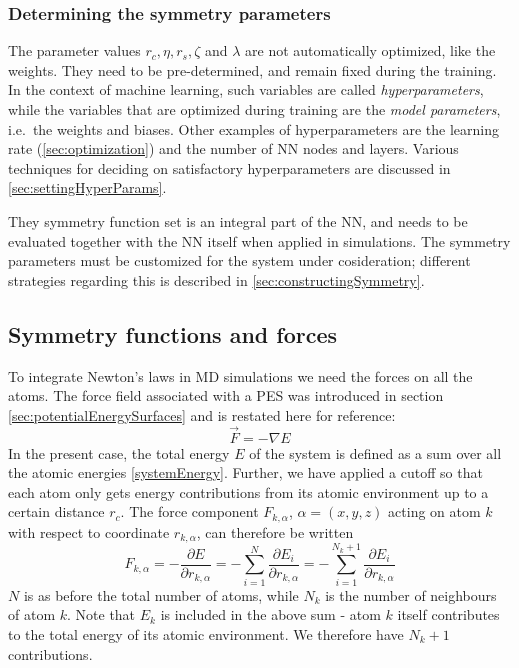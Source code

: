 \documentclass[twoside,english]{uiofysmaster}
\begin{document}
\subsubsection{Determining the symmetry parameters}
The parameter values $r_c, \eta, r_s, \zeta$ and $\lambda$ are not automatically optimized, like the weights. 
They need to be pre-determined, and remain fixed during the training. In the context of machine learning, such variables are called
\textit{hyperparameters}, while the variables that are optimized during training are the \textit{model parameters}, i.e.\ 
the weights and biases. Other examples of hyperparameters are the learning rate (\autoref{sec:optimization}) and 
the number of NN nodes and layers. Various techniques for deciding on satisfactory hyperparameters are
discussed in  \autoref{sec:settingHyperParams}. 

They symmetry function set is
an integral part of the NN, and needs to be evaluated together with the NN itself when applied in simulations. 
The symmetry parameters must be customized for the system under cosideration; different strategies regarding this
is described in \autoref{sec:constructingSymmetry}.


\subsection{Symmetry functions and forces} \label{sec:symmAndForces}
To integrate Newton's laws in MD simulations we need the forces on all the atoms. The force field associated with a PES
was introduced in section \ref{sec:potentialEnergySurfaces} and is restated here for reference:
\begin{equation}
 \vec{F} = -\nabla E
 \label{forcePES2}
\end{equation}
In the present case, the total energy $E$ of the system is defined as a sum over all the atomic energies \eqref{systemEnergy}. 
Further, we have applied a cutoff so that each atom only gets energy contributions from its atomic environment up 
to a certain distance $r_c$.
The force component $F_{k,\alpha}$, $\alpha = (x,y,z)$ acting on atom $k$ with respect to coordinate $r_{k,\alpha}$,
can therefore be written \cite{Behler11symmetry}
\begin{equation}
 F_{k,\alpha} = -\frac{\partial E}{\partial r_{k,\alpha}} = -\sum_{i=1}^N\frac{\partial E_i}{\partial r_{k,\alpha}}
 = -\sum_{i=1}^{N_k+1}\frac{\partial E_i}{\partial r_{k,\alpha}}
 \label{forceAtomk}
\end{equation}
$N$ is as before the total number of atoms, while $N_k$ is the number of neighbours of atom $k$. 
Note that $E_k$ is included in the above sum - atom $k$ itself contributes to the total energy of its atomic
environment. We therefore have $N_k+1$ contributions. 
\end{document}
